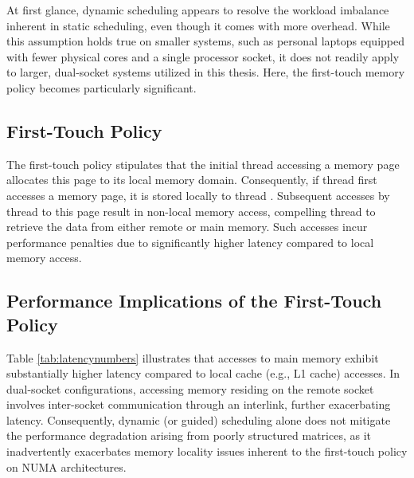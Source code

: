 At first glance, dynamic scheduling appears to resolve the workload imbalance inherent in static scheduling, even though it comes with more overhead. While this assumption holds true on smaller systems, such as personal laptops equipped with fewer physical cores and a single processor socket, it does not readily apply to larger, dual-socket systems utilized in this thesis. Here, the first-touch memory policy becomes particularly significant.

\subsection{First-Touch Policy}

The first-touch policy stipulates that the initial thread accessing a memory page allocates this page to its local memory domain. Consequently, if thread  first accesses a memory page, it is stored locally to thread . Subsequent accesses by thread  to this page result in non-local memory access, compelling thread  to retrieve the data from either remote or main memory. Such accesses incur performance penalties due to significantly higher latency compared to local memory access.

\subsection{Performance Implications of the First-Touch Policy}

Table \ref{tab:latencynumbers} illustrates that accesses to main memory exhibit substantially higher latency compared to local cache (e.g., L1 cache) accesses. In dual-socket configurations, accessing memory residing on the remote socket involves inter-socket communication through an interlink, further exacerbating latency. Consequently, dynamic (or guided) scheduling alone does not mitigate the performance degradation arising from poorly structured matrices, as it inadvertently exacerbates memory locality issues inherent to the first-touch policy on NUMA architectures.











